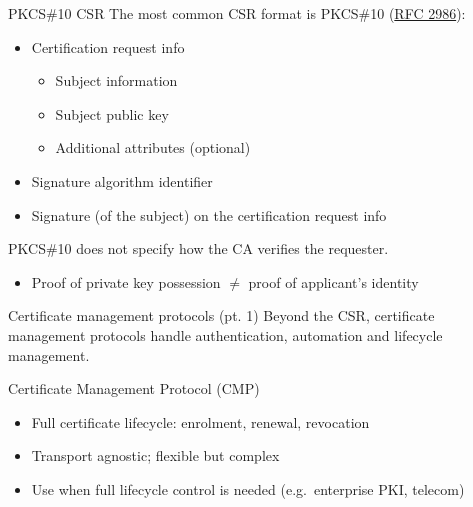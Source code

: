 \begin{frame}{PKCS\#10 CSR}
  The most common CSR format is PKCS\#10 (\href{https://datatracker.ietf.org/doc/html/rfc2986}{RFC 2986}):
  \begin{itemize}[<+(1)->]
    \item Certification request info
    \begin{itemize}
      \item Subject information
      \item Subject public key
      \item Additional attributes (optional)
    \end{itemize}
    \item Signature algorithm identifier
    \item Signature (of the subject) on the certification request info
  \end{itemize}

  \vspace*{0.5em}

  \pause
  PKCS\#10 does not specify how the CA verifies the requester.
  \begin{itemize}[<+(1)->]
    \item Proof of private key possession $\neq$ proof of applicant's identity
  \end{itemize}
\end{frame}

\begin{frame}{Certificate management protocols (pt. 1)}
  Beyond the CSR, certificate management protocols handle authentication, automation and lifecycle management.

  \vspace*{1em}

  \pause
  Certificate Management Protocol (CMP)
  \begin{itemize}[<+(1)->]
    \item Full certificate lifecycle: enrolment, renewal, revocation
    \item Transport agnostic; flexible but complex
    \item Use when full lifecycle control is needed (e.g.\ enterprise PKI, telecom)
  \end{itemize}
\end{frame}

